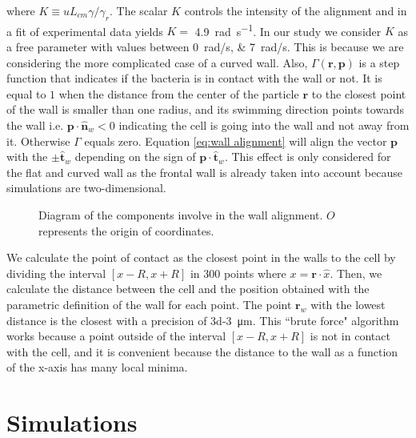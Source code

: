 where $K\equiv u L_{cm}\gamma / \gamma_r$. The scalar $K$ controls the intensity of the alignment and in \cite{Bianchi20193DInterface} a fit of experimental data yields $K=$ \SI[per-mode = symbol]{4.9}{\radian \per \second}. In our study we consider $K$ as a free parameter with values between \SIlist[per-mode = symbol, list-units=single]{0;7}{\radian\per\second}. This is because we are considering the more complicated case of a curved wall. Also, $\Gamma(\textbf{r}, \textbf{p})$ is a step function that indicates if the bacteria is in contact with the wall or not. It is equal to $1$ when the distance from the center of the particle $\textbf{r}$ to the closest point of the wall is smaller than one radius, and its swimming direction points towards the wall i.e. $\textbf{p} \cdot \hat{\textbf{n}}_w < 0$ indicating the cell is going into the wall and not away from it. Otherwise $\Gamma$ equals zero.  Equation \eqref{eq:wall alignment} will align the vector $\textbf{p}$ with the $\pm\hat{\textbf{t}}_w$ depending on the sign of $\textbf{p} \cdot \hat{\textbf{t}}_w$. This effect is only considered for the flat and curved wall as the frontal wall is already taken into account because simulations are two-dimensional.

\begin{wrapfigure}{r}{0.5\linewidth}
\centering

\caption[Diagram of the components involve in the wall allignment]{Diagram of the components involve in the wall alignment. $O$ represents the origin of coordinates.}
\label{circular trajectories}
\end{wrapfigure}

We calculate the point of contact as the closest point in the walls to the cell by dividing the interval $[x-R, x+R]$ in 300 points where $x = \textbf{r} \cdot \hat{x}$. Then, we calculate the distance between the cell and the position obtained with the parametric definition of the wall for each point. The point $\textbf{r}_w$ with the lowest distance is the closest with a precision of \SI{3d-3}{\micro\meter}. This ``brute force" algorithm works because a point outside of the interval $[x-R, x+R]$ is not in contact with the cell, and it is convenient because the distance to the wall as a function of the x-axis has many local minima.


\section{Simulations}

